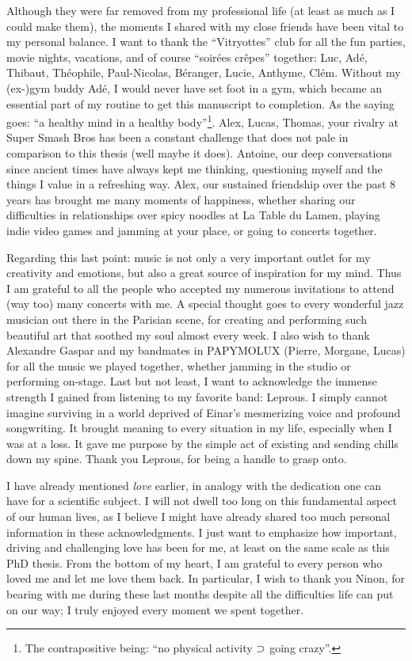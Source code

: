 Although they were far removed from my professional life (at least as much as I could make them), the moments I shared with my close friends have been vital to my personal balance. I want to thank the ``Vitryottes'' club for all the fun parties, movie nights, vacations, and of course ``soirées crêpes'' together: Luc, Adé, Thibaut, Théophile, Paul-Nicolas, Béranger, Lucie, Anthyme, Clém. Without my (ex-)gym buddy Adé, I would never have set foot in a gym, which became an essential part of my routine to get this manuscript to completion. As the saying goes: ``a healthy mind in a healthy body''\footnote{The contrapositive being: ``no physical activity $\supset$ going crazy''.}. Alex, Lucas, Thomas, your rivalry at Super Smash Bros has been a constant challenge that does not pale in comparison to this thesis (well maybe it does). Antoine, our deep conversations since ancient times have always kept me thinking, questioning myself and the things I value in a refreshing way. Alex, our sustained friendship over the past 8 years has brought me many moments of happiness, whether sharing our difficulties in relationships over spicy noodles at La Table du Lamen, playing indie video games and jamming at your place, or going to concerts together.

Regarding this last point: music is not only a very important outlet for my creativity and emotions, but also a great source of inspiration for my mind. Thus I am grateful to all the people who accepted my numerous invitations to attend (way too) many concerts with me. A special thought goes to every wonderful jazz musician out there in the Parisian scene, for creating and performing such beautiful art that soothed my soul almost every week. I also wish to thank Alexandre Gaspar and my bandmates in PAPYMOLUX (Pierre, Morgane, Lucas) for all the music we played together, whether jamming in the studio or performing on-stage. Last but not least, I want to acknowledge the immense strength I gained from listening to my favorite band: Leprous. I simply cannot imagine surviving in a world deprived of Einar's mesmerizing voice and profound songwriting. It brought meaning to every situation in my life, especially when I was at a loss. It gave me purpose by the simple act of existing and sending chills down my spine. Thank you Leprous, for being a handle to grasp onto.

I have already mentioned \emph{love} earlier, in analogy with the dedication one can have for a scientific subject. I will not dwell too long on this fundamental aspect of our human lives, as I believe I might have already shared too much personal information in these acknowledgments. I just want to emphasize how important, driving and challenging love has been for me, at least on the same scale as this PhD thesis. From the bottom of my heart, I am grateful to every person who loved me and let me love them back. In particular, I wish to thank you Ninon, for bearing with me during these last months despite all the difficulties life can put on our way; I truly enjoyed every moment we spent together.

